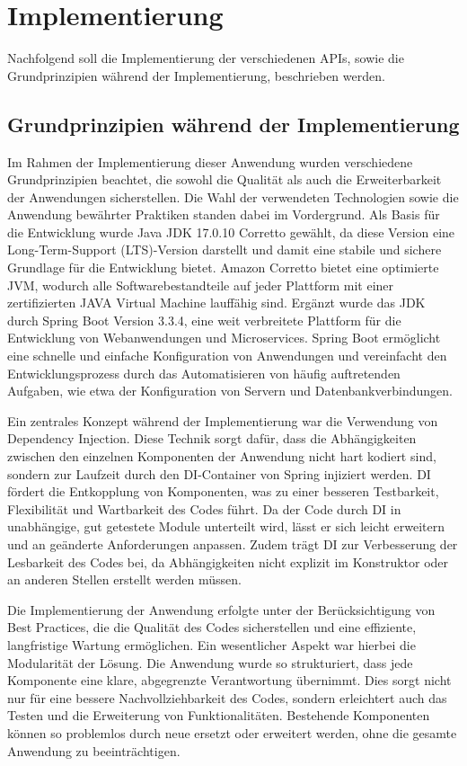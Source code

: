 \chapter{Implementierung} %
\label{sec:implementierung}
Nachfolgend soll die Implementierung der verschiedenen APIs, sowie die Grundprinzipien während der Implementierung, beschrieben werden.
\section{Grundprinzipien während der Implementierung} %
\label{sec:prinzipien}
Im Rahmen der Implementierung dieser Anwendung wurden verschiedene Grundprinzipien beachtet, die sowohl die Qualität als auch die Erweiterbarkeit der Anwendungen  sicherstellen. Die Wahl der verwendeten Technologien sowie die Anwendung bewährter Praktiken standen dabei im Vordergrund. Als Basis für die Entwicklung wurde Java JDK 17.0.10 Corretto gewählt, da diese Version eine Long-Term-Support (LTS)-Version darstellt und damit eine stabile und sichere Grundlage für die Entwicklung bietet. Amazon Corretto bietet eine optimierte JVM, wodurch alle Softwarebestandteile auf jeder Plattform mit einer zertifizierten JAVA Virtual Machine lauffähig sind. Ergänzt wurde das JDK durch Spring Boot Version 3.3.4, eine weit verbreitete Plattform für die Entwicklung von Webanwendungen und Microservices. Spring Boot ermöglicht eine schnelle und einfache Konfiguration von Anwendungen und vereinfacht den Entwicklungsprozess durch das Automatisieren von häufig auftretenden Aufgaben, wie etwa der Konfiguration von Servern und Datenbankverbindungen.

Ein zentrales Konzept während der Implementierung war die Verwendung von Dependency Injection. Diese Technik sorgt dafür, dass die Abhängigkeiten zwischen den einzelnen Komponenten der Anwendung nicht hart kodiert sind, sondern zur Laufzeit durch den DI-Container von Spring injiziert werden. DI fördert die Entkopplung von Komponenten, was zu einer besseren Testbarkeit, Flexibilität und Wartbarkeit des Codes führt. Da der Code durch DI in unabhängige, gut getestete Module unterteilt wird, lässt er sich leicht erweitern und an geänderte Anforderungen anpassen. Zudem trägt DI zur Verbesserung der Lesbarkeit des Codes bei, da Abhängigkeiten nicht explizit im Konstruktor oder an anderen Stellen erstellt werden müssen.

Die Implementierung der Anwendung erfolgte unter der Berücksichtigung von Best Practices, die die Qualität des Codes sicherstellen und eine effiziente, langfristige Wartung ermöglichen. Ein wesentlicher Aspekt war hierbei die Modularität der Lösung. Die Anwendung wurde so strukturiert, dass jede Komponente eine klare, abgegrenzte Verantwortung übernimmt. Dies sorgt nicht nur für eine bessere Nachvollziehbarkeit des Codes, sondern erleichtert auch das Testen und die Erweiterung von Funktionalitäten. Bestehende Komponenten können so problemlos durch neue ersetzt oder erweitert werden, ohne die gesamte Anwendung zu beeinträchtigen.




